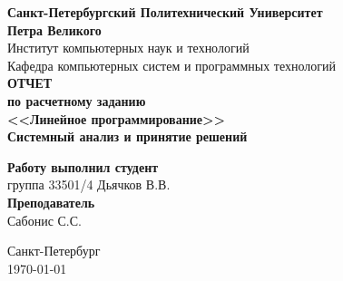 \begin{titlepage}
\begin{center}
	\textbf{Санкт-Петербургский Политехнический Университет \\Петра Великого}\\[0.3cm]
	\small Институт компьютерных наук и технологий \\[0.3cm]
	\small Кафедра компьютерных систем и программных технологий\\[4cm]
	
	\textbf{ОТЧЕТ}\\ \textbf{по расчетному заданию}\\[0.5cm]
	\textbf{<<Линейное программирование>>}\\[0.1cm]
	\textbf{Системный анализ и принятие решений}\\[8.0cm]
\end{center}

\begin{flushright}
	\begin{minipage}{0.4\textwidth}
		\begin{flushleft}
			\small \textbf{Работу выполнил студент}\\[3mm]
			\small группа 33501/4 \hspace*{6mm} Дьячков В.В.\\[5mm]
			
			\small \textbf{Преподаватель}\\[5mm]
		 	\small \sign[3cm] \hspace*{5mm} Сабонис С.С.\\[0.5cm]
		\end{flushleft}
	\end{minipage}
\end{flushright}

\vfill

\begin{center}
	\small Санкт-Петербург\\
	\small \today
\end{center}
\end{titlepage}

\addtocounter{page}{1}